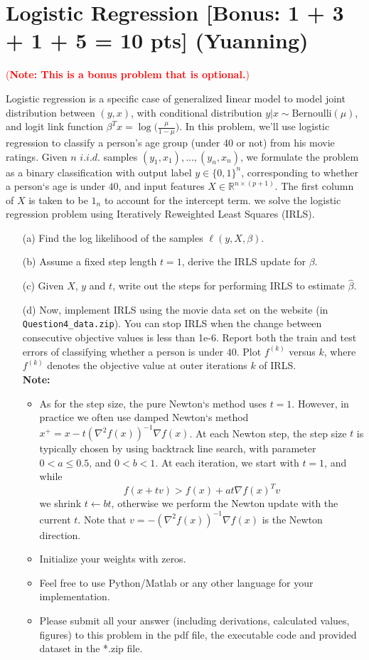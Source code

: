 
\section{Logistic Regression [Bonus: 1 + 3 + 1 + 5 = 10 pts] (Yuanning)}
\textcolor{red}{(\textbf{Note: This is a bonus problem that is optional.})}

Logistic regression is a specific case of generalized Iinear model to model joint distribution between $(y, x)$, with conditional distribution $y|x \sim \text{Bernoulli}(\mu)$, and logit link function $\beta^Tx = \log\Big(\frac{\mu}{1-\mu}\Big)$. In this problem, we'll use logistic regression to classify a person's age group (under 40 or not) from his movie ratings. Given $n$ $i.i.d.$ samples $(y_1, x_1), ..., (y_n, x_n)$, we formulate the problem as a binary classification with output label  $y \in \{0,1\}^n$, corresponding to whether a person`s age is under $40$, and input features $X \in \mathbb{R}^{n \times (p+1)}$. The first column of $X$ is taken to be $1_n$ to account for the intercept term. we solve the logistic regression problem using Iteratively Reweighted Least Squares (IRLS).

\begin{enumerate}
\item[(a)] Find the log likelihood of the samples $\ell(y, X, \beta)$.
\item[(b)] Assume a fixed step length $t = 1$, derive the IRLS update for $\beta$. 
\item[(c)] Given $X$, $y$ and $t$, write out the steps for performing IRLS to estimate $\hat{\beta}$.
\item[(d)] Now, implement IRLS using the movie data set on the website (in \texttt{Question4\_data.zip}). You can stop IRLS when the change between consecutive objective values is less than 1e-6. Report both the train and test errors of classifying whether a person is under $40$. Plot $f^{(k)}$ versus $k$,  where $f^{(k)}$ denotes the objective value at outer iterations $k$ of IRLS. 
\\
\textbf{Note:} 
\begin{itemize}
\item As for the step size, the pure Newton`s method uses $t = 1$.  However, in practice we often use damped Newton`s method $x^+ = x - t(\nabla^2f(x))^{-1}\nabla f(x)$. At each Newton step, the step size $t$ is typically chosen by using backtrack line search, with parameter $0 < a \leq 0.5$, and $0 < b < 1$. At each iteration, we start with $t = 1$, and while $$f(x + tv) > f(x) + at\nabla f(x)^Tv $$ we shrink $t \leftarrow bt$, otherwise we perform the Newton update with the current $t$. Note that $v = -(\nabla^2f(x))^{-1}\nabla f(x)$ is the Newton direction.
\item Initialize your weights with zeros. 
\item Feel free to use Python/Matlab or any other language for your implementation. 
\item Please submit all your answer (including derivations, calculated values, figures) to this problem in the pdf file, the executable code and provided dataset in the *.zip file.
\end{itemize}
\end{enumerate}